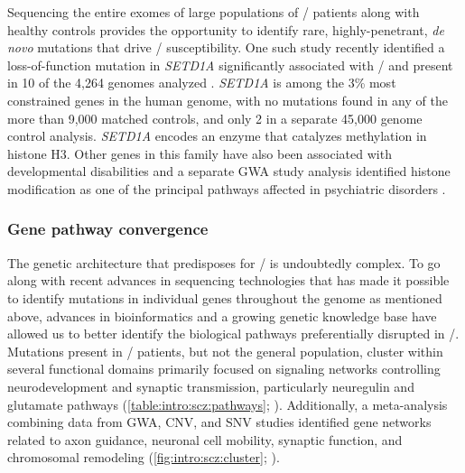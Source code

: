 Sequencing the entire exomes of large populations of \scz/ patients along with healthy controls provides the opportunity to identify rare, highly-penetrant, \textit{de novo} mutations that drive \scz/ susceptibility. One such study recently identified a loss-of-function mutation in \textit{SETD1A} significantly associated with \scz/ and present in 10 of the 4,264 genomes analyzed \citep{Singh2016}.
\textit{SETD1A} is among the 3\% most constrained genes in the human genome, with no mutations found in any of the more than 9,000 matched controls, and only 2 in a separate 45,000 genome control analysis.
\textit{SETD1A} encodes an enzyme that catalyzes methylation in histone H3. Other genes in this family have also been associated with developmental disabilities and a separate \ac{GWA} study analysis identified histone modification as one of the principal pathways affected in psychiatric disorders \citep{ODushlaine2015}.

\subsubsection{Gene pathway convergence}
The genetic architecture that predisposes for \scz/ is undoubtedly complex.
To go along with recent advances in sequencing technologies that has made it possible to identify mutations in individual genes throughout the genome as mentioned above, advances in bioinformatics and a growing genetic knowledge base have allowed us to better identify the biological pathways preferentially disrupted in \scz/.
Mutations present in \scz/ patients, but not the general population, cluster within several functional domains primarily focused on signaling networks controlling neurodevelopment and synaptic transmission, particularly neuregulin and glutamate pathways (\autoref{table:intro:scz:pathways}; \citealp{Walsh2008, Glessner2010}).
Additionally, a meta-analysis combining data from \ac{GWA}, \ac{CNV}, and \ac{SNV} studies identified gene networks related to axon guidance, neuronal cell mobility, synaptic function, and chromosomal remodeling (\autoref{fig:intro:scz:cluster}; \citealp{Gilman2012}).

